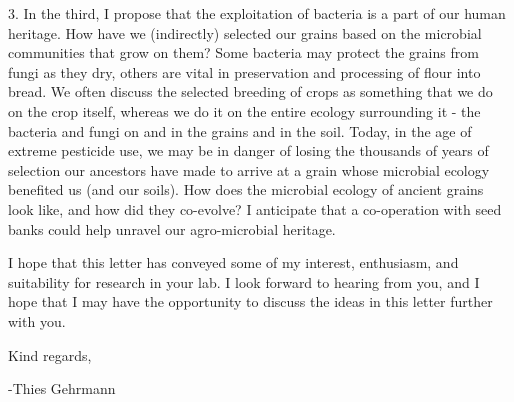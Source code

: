 \documentclass[letterpaper, 10pt]{article} %
\begin{document}
\begin{tcolorbox}[
	blanker,
	width=0.95\textwidth,
	enlarge left by=0.025\textwidth,
	enlarge right by=0.025\textwidth,
	before skip=6pt,
	breakable]
3. In the third, I propose that the exploitation of bacteria is a part of our human heritage. How have we (indirectly) selected our grains based on the microbial communities that grow on them? Some bacteria may protect the grains from fungi as they dry, others are vital in preservation and processing of flour into bread. We often discuss the selected breeding of crops as something that we do on the crop itself, whereas we do it on the entire ecology surrounding it - the bacteria and fungi on and in the grains and in the soil. Today, in the age of extreme pesticide use, we may be in danger of losing the thousands of years of selection our ancestors have made to arrive at a grain whose microbial ecology benefited us (and our soils). How does the microbial ecology of ancient grains look like, and how did they co-evolve? I anticipate that a co-operation with seed banks could help unravel our agro-microbial heritage.

I hope that this letter has conveyed some of my interest, enthusiasm, and suitability for research in your lab. I look forward to hearing from you, and I hope that I may have the opportunity to discuss the ideas in this letter further with you.

Kind regards,

-Thies Gehrmann
\end{tcolorbox}



\thispagestyle{empty}
\end{document}
